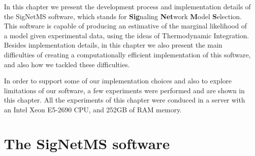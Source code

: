 In this chapter we present the development process and implementation
details of the SigNetMS software, which stands for {\bf Sig}naling 
{\bf Net}work {\bf M}odel {\bf S}election. This software is capable of
producing an estimative of the marginal likelihood of a model given
experimental data, using the ideas of Thermodynamic Integration. Besides
implementation details, in this chapter we also present the main 
difficulties of creating a computationally efficient implementation of
this software, and also how we tackled these difficulties. 

In order to support some of our implementation choices and also to
explore limitations of our software, a few experiments were performed
and are shown in this chapter. All the experiments of this chapter were
conduced in a server with an Intel Xeon E5-2690 CPU, and 252GB of RAM
memory.


\section{The SigNetMS software}



